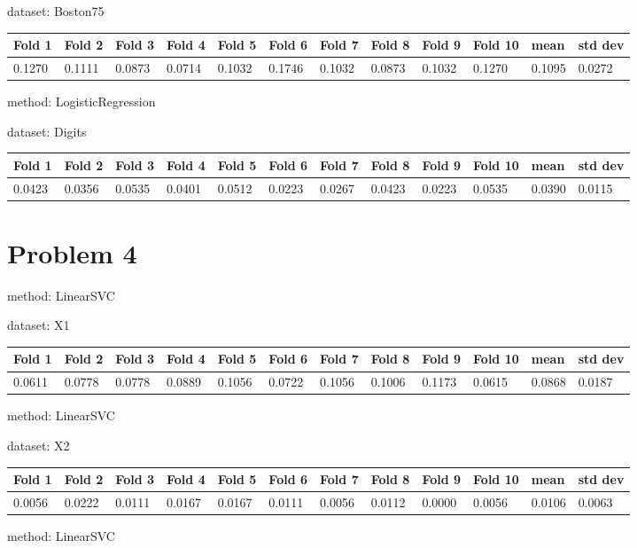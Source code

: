 \documentclass{article}
\begin{document}
\noindent dataset: Boston75

\begin{center}
	\begin{tabular}  { | l | l | l | l | l | l | l | l | l | l | l | l | }
	\hline
	Fold 1 & Fold 2 & Fold 3 & Fold 4 & Fold 5 & Fold 6 & Fold 7 & Fold 8 & Fold 9 & Fold 10 & mean & std dev\\ \hline
	0.1270 & 0.1111 & 0.0873 & 0.0714 & 0.1032 & 0.1746 & 0.1032 & 0.0873 & 0.1032 & 0.1270 & 0.1095 & 0.0272\\
	\hline
	\end{tabular}
\end{center}
\noindent method: LogisticRegression

\noindent dataset: Digits

\begin{center}
	\begin{tabular}  { | l | l | l | l | l | l | l | l | l | l | l | l | }
	\hline
	Fold 1 & Fold 2 & Fold 3 & Fold 4 & Fold 5 & Fold 6 & Fold 7 & Fold 8 & Fold 9 & Fold 10 & mean & std dev\\ \hline
	0.0423 & 0.0356 & 0.0535 & 0.0401 & 0.0512 & 0.0223 & 0.0267 & 0.0423 & 0.0223 & 0.0535 & 0.0390 & 0.0115\\
	\hline
	\end{tabular}
\end{center}


\section{Problem 4}

\noindent method: LinearSVC

\noindent dataset: X1

\begin{center}
	\begin{tabular}  { | l | l | l | l | l | l | l | l | l | l | l | l | }
	\hline
	Fold 1 & Fold 2 & Fold 3 & Fold 4 & Fold 5 & Fold 6 & Fold 7 & Fold 8 & Fold 9 & Fold 10 & mean & std dev\\ \hline
	0.0611 & 0.0778 & 0.0778 & 0.0889 & 0.1056 & 0.0722 & 0.1056 & 0.1006 & 0.1173 & 0.0615 & 0.0868 & 0.0187\\
	\hline
	\end{tabular}
\end{center}
\noindent method: LinearSVC

\noindent dataset: X2

\begin{center}
	\begin{tabular}  { | l | l | l | l | l | l | l | l | l | l | l | l | }
	\hline
	Fold 1 & Fold 2 & Fold 3 & Fold 4 & Fold 5 & Fold 6 & Fold 7 & Fold 8 & Fold 9 & Fold 10 & mean & std dev\\ \hline
	0.0056 & 0.0222 & 0.0111 & 0.0167 & 0.0167 & 0.0111 & 0.0056 & 0.0112 & 0.0000 & 0.0056 & 0.0106 & 0.0063\\
	\hline
	\end{tabular}
\end{center}
\noindent method: LinearSVC
\end{document}
